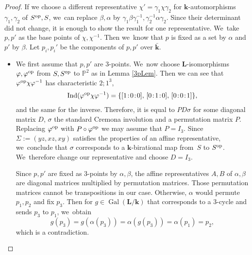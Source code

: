 \documentclass[JEP,XML,SOM,Unicode,NoFloatCountersInSection, NoEqCountersInSection,published]{cedram}
\newcommand{\Ind}{\textup{Ind}}
\newcommand{\op}{\textup{op}}
\newcommand{\sep}{\mkern2mu{:}\mkern2mu}
\DeclareMathOperator{\Gal}{Gal}
\theoremstyle{definition}
\newcommand{\kk}{{\boldsymbol{k}}}
\newcommand{\LL}{{\boldsymbol{L}}}
\begin{document}
\begin{proof}
If we choose a different representative $\chi' = \gamma_1 \chi \gamma_2$ for $\kk$-automorphisms $\gamma_1, \gamma_2$ of $S^{\op},S$, we~can replace $\beta, \alpha$ by $\gamma_1 \beta \gamma_1^{-1}, \gamma_2^{-1} \alpha \gamma_2$. Since their determinant did not change, it is enough to show the result for one representative. We~take $p,p'$ as the base points of $\chi, \chi^{-1}$. Then we~know that $p$ is fixed as a set by $\alpha$ and $p'$ by $\beta$. Let $p_i,p_i'$ be the components of $p,p'$ over $\bar{\kk}$.
\begin{itemize}
\item We first assume that $p,p'$ are $3$\nobreakdash-points. We~now choose $\LL$-isomorphisms $\varphi, \varphi^{\op}$ from $S,S^{\op}$ to $\mathbb{P}^2$ as in Lemma \ref{3pLem}. Then we can see that $\varphi^{\op} \chi \varphi^{-1}$ has characteristic $2;1^3$,
\[
\Ind(\varphi^{\op} \chi \varphi^{-1}) = \{ [1\sep 0\sep 0],\, [0\sep 1\sep 0],\, [0\sep 0\sep 1]\},
\]
and the same for the inverse. Therefore, it is equal to $P D \sigma$ for some diagonal matrix $D$, $\sigma$ the standard Cremona involution and a permutation matrix $P$. Replacing $\varphi^{\op}$ with $P \circ \varphi^{\op}$ we may assume that $P = I_3$. Since $\Sigma:= (yz,xz,xy)$ satisfies the properties of an affine representative, we~conclude that $\sigma$ corresponds to a $\kk$-birational map from~$S$ to $S^{\op}$. We~therefore change our representative and choose $D=I_3$.

Since $p,p'$ are fixed as $3$\nobreakdash-points by $\alpha, \beta$, the affine representatives $A,B$ of $\alpha, \beta$ are diagonal matrices multiplied by permutation matrices. Those permutation matrices cannot be transpositions in our case. Otherwise, $\alpha$ would permute $p_1,p_2$ and fix $p_3$. Then for $g \in \Gal(\LL/\kk)$ that corresponds to a $3$\nobreakdash-cycle and sends $p_3$ to $p_1$, we~obtain
\[
g(p_3) = g(\alpha(p_3)) = \alpha(g(p_3)) = \alpha(p_1) = p_2,
\]
which is a contradiction.


\end{itemize}
\end{proof}
\end{document}
